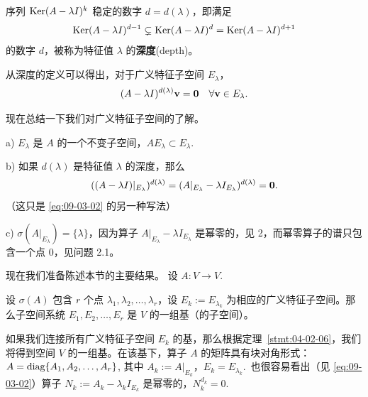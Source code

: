 \begin{definition*}
序列 $\operatorname{Ker}(A - \lambda I)^k$ 稳定的数字 $d = d(\lambda)$，即满足 $$\operatorname{Ker}(A - \lambda I)^{d-1} \subsetneq \operatorname{Ker}(A - \lambda I)^d = \operatorname{Ker}(A - \lambda I)^{d+1}$$
的数字 $d$，被称为特征值 $\lambda$ 的\textbf{深度}(depth)。
\end{definition*}

从深度的定义可以得出，对于广义特征子空间 $E_\lambda$，
\begin{equation}\label{eq:09-03-02}
(A - \lambda I)^{d(\lambda)} \mathbf{v} = \mathbf{0} \quad \forall \mathbf{v} \in E_\lambda.
\end{equation}

现在总结一下我们对广义特征子空间的了解。

a) $E_\lambda$ 是 $A$ 的一个不变子空间，$AE_\lambda \subset E_\lambda$.~

b) 如果 $d(\lambda)$ 是特征值 $\lambda$ 的深度，那么
$$((A - \lambda I)|_{E_\lambda})^{d(\lambda)} = (A|_{E_\lambda} - \lambda I_{E_\lambda})^{d(\lambda)} = \mathbf{0}.$$（这只是 \eqref{eq:09-03-02} 的另一种写法）

c) $\sigma(A|_{E_\lambda}) = \{\lambda\}$，因为算子 $A|_{E_\lambda} - \lambda I_{E_\lambda}$ 是幂零的，见 2，而幂零算子的谱只包含一个点 $0$，见问题 2.1。

现在我们准备陈述本节的主要结果。
设 $A: V \to V$.~

\begin{theorem}\label{stmt:09-03-04}
设 $\sigma(A)$ 包含 $r$ 个点 $\lambda_1, \lambda_2, \dots, \lambda_r$，设 $E_k := E_{\lambda_k}$ 为相应的广义特征子空间。那么子空间系统 $E_1, E_2, \dots, E_r$ 是 $V$ 的一组基（的子空间）。\end{theorem}

\begin{remark}\label{stmt:09-03-05}
如果我们连接所有广义特征子空间 $E_k$ 的基，那么根据定理~\ref{stmt:04-02-06}，我们将得到空间 $V$ 的一组基。在该基下，算子 $A$ 的矩阵具有块对角形式：
$A = \operatorname{diag}\{A_1, A_2, \dots, A_r\}$,
其中 $A_k := A|_{E_k}$，$E_k = E_{\lambda_k}$.~也很容易看出（见 \eqref{eq:09-03-02}）算子 $N_k := A_k - \lambda_k I_{E_k}$ 是幂零的，$N_k^{d_k} = 0$.~
\end{remark}


